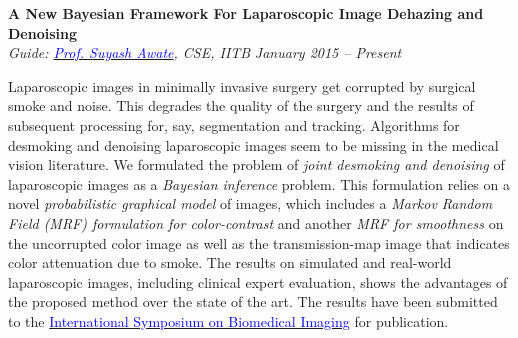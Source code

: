\documentclass[margin,line]{res}
\newenvironment{list1}{
  \begin{list}{\ding{113}}{%
      \setlength{\itemsep}{0in}
      \setlength{\parsep}{0in} \setlength{\parskip}{0in}
      \setlength{\topsep}{0in} \setlength{\partopsep}{0in} 
      \setlength{\leftmargin}{0.17in}}}{\end{list}}
\begin{document}
\begin{resume}
{\bf A New Bayesian Framework For Laparoscopic Image Dehazing and Denoising} \\
{\em Guide: \href{https://www.cse.iitb.ac.in/~suyash}{\textcolor{blue}{Prof. Suyash Awate}}, CSE, IITB} \hfill {\it January 2015 -- Present} \\
\vspace*{-.13in}
\begin{list1}
\item[]
Laparoscopic images in minimally invasive surgery get corrupted by surgical smoke and noise. This degrades the quality of the surgery and the results of subsequent processing for, say, segmentation and tracking. Algorithms for desmoking and denoising laparoscopic images seem to be missing in the medical vision literature. We formulated the problem of \textit{joint desmoking and denoising} of laparoscopic images as a \textit{Bayesian inference} problem. This formulation relies on a novel \textit{probabilistic graphical model} of images, which includes a \textit{Markov Random Field (MRF) formulation for color-contrast} and another \textit{MRF for smoothness} on the uncorrupted color image as well as the transmission-map image that indicates color attenuation due to smoke. The results on simulated and real-world laparoscopic images, including clinical expert evaluation, shows the advantages of the proposed method over the state of the art. The results have been submitted to the \href{http://biomedicalimaging.org/2016/}{\textcolor{blue} {International Symposium on Biomedical Imaging}} for publication.
\end{list1}


\end{resume}
\end{document}
